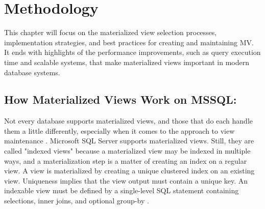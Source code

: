 \section{Methodology}\vspace{.4cm}
This chapter will focus on the materialized view selection processes, implementation strategies, and best practices for creating and maintaining MV. It ends with highlights of the performance improvements, such as query execution time and scalable systems, that make materialized views important in modern database systems.

 \subsection{How Materialized Views Work on MSSQL:} Not every database supports materialized views, and those that do each handle them a little differently, especially when it comes to the approach to view maintenance \cite{hattemer-2020}. Microsoft SQL Server supports materialized views. Still, they are called "indexed views" because a materialized view may be indexed in multiple ways, and a materialization step is a matter of creating an index on a regular view. A view is materialized by creating a unique clustered index on an existing view. Uniqueness implies that the view output must contain a unique key. An indexable view must be defined by a single-level SQL statement containing selections, inner joins, and optional group-by \cite{goldstein-2001}.\vspace{0.8cm}

